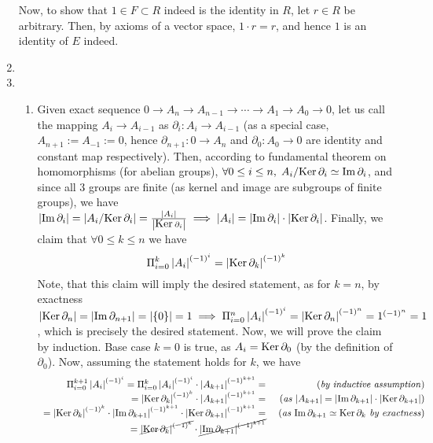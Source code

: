 \documentclass[8pt,fleqn]{article} %
\begin{document}
\begin{enumerate}[label=\bfseries Problem \arabic*.]
		Now, to show that $1\in F\subset R$ indeed is the identity in $R$, let $r\in R$ be arbitrary. Then, by axioms of
		a vector space, $1\cdot r=r$, and hence $1$ is an identity of $E$ indeed.
	\item 
	\item \begin{enumerate}[label=(\arabic*).]
				\newcommand{\Ker}{\mbox{\normalfont Ker\,}}
			\item Given exact sequence $0\to A_n\to A_{n-1}\to\cdots\to A_1\to A_0\to 0$, let us call the mapping 
				$A_i\to A_{i-1}$ as $\partial_i: A_i\to A_{i-1}$ (as a special case, $A_{n+1}:=A_{-1}:=0$, hence
				$\partial_{n+1}:0\to A_n$ and $\partial_0:A_0\to 0$ are identity and constant map respectively).
				Then, according to fundamental theorem on homomorphisms (for abelian groups), $\forall 0\leq i\leq n,
				\;A_i/\Ker \partial_i\simeq\Im\partial_i$, and since all 3 groups are finite (as kernel and image
				are subgroups of finite groups), we have
				$\myabs{\Im\partial_i}=\myabs{A_i/\Ker\partial_i}=\frac{\myabs{A_i}}
				{\myabs{\Ker\partial_i}}\implies \myabs{A_i}=\myabs{\Im\partial_i}\cdot\myabs{\Ker\partial_i}$.
				Finally, we claim that $\forall 0\leq k\leq n$ we have 
				\[\Pi_{i=0}^k \myabs{A_i}^{(-1)^i}=\myabs{\Ker\partial_k}^{(-1)^k}\]
				Note, that this claim will imply the desired statement, as for $k=n$, by exactness
				$\myabs{\Ker\partial_n}=\myabs{\Im\partial_{n+1}}=\myabs{\mycbra{0}}=1\implies
				\Pi_{i=0}^n \myabs{A_i}^{(-1)^i}=\myabs{\Ker\partial_n}^{(-1)^n}=1^{(-1)^n}=1$, which is precisely
				the desired statement. Now, we will prove the claim by induction. Base case $k=0$ is true, as
				$A_i=\Ker\partial_0$ (by the definition of $\partial_0$). Now, assuming the statement holds
				for $k$, we have
		\[\begin{array}{rr}
			\Pi_{i=0}^{k+1}\myabs{A_i}^{(-1)^i}=\Pi_{i=0}^{k}\myabs{A_i}^{(-1)^i}\cdot\myabs{A_{k+1}}^{(-1)^{k+1}}=
			&\mbox{ (\textit{by inductive assumption}) }\\
			=\myabs{\Ker\partial_k}^{(-1)^k}\cdot\myabs{A_{k+1}}^{(-1)^{k+1}}=
			&\mbox{ (\textit{as $\myabs{A_{k+1}}=\myabs{\Im\partial_{k+1}}\cdot\myabs{\Ker\partial_{{k+1}}}$}) }\\
			={\myabs{\Ker\partial_k}^{(-1)^k}}\cdot{\myabs{\Im\partial_{k+1}}^{(-1)^{k+1}}}
				\cdot\myabs{\Ker\partial_{{k+1}}}^{(-1)^{k+1}}=
			&\mbox{ (\textit{as ${\Im\partial_{k+1}}\simeq{\Ker\partial_k}$ by exactness}) }\\
			=\cancel{\myabs{\Ker\partial_k}^{(-1)^k}}\cdot\cancel{\myabs{\Im\partial_{k+1}}^{(-1)^{k+1}}}

\end{array}\]
\end{enumerate}
\end{enumerate}
\end{document}
